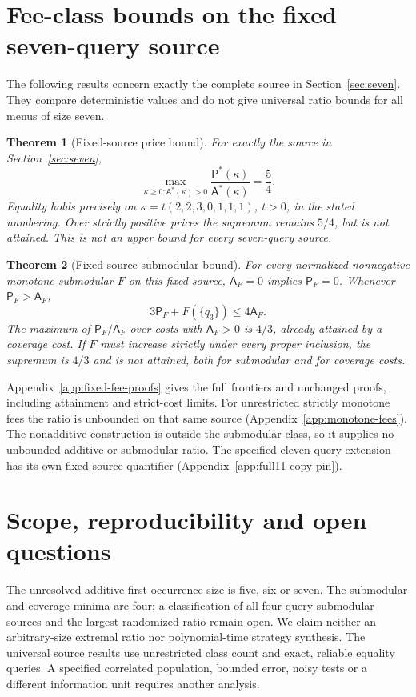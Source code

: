 \documentclass[pdflatex,sn-mathphys-num]{sn-jnl}
\newcommand{\A}{\mathsf{A}}
\newcommand{\Pcost}{\mathsf{P}}
\theoremstyle{thmstyleone}
\newtheorem{theorem}{Theorem}
\theoremstyle{thmstylethree}
\theoremstyle{thmstyletwo}
\begin{document}
\section{Fee-class bounds on the fixed seven-query source}
\label{sec:fixed-cost-core}
The following results concern exactly the complete source in
Section~\ref{sec:seven}. They compare deterministic values and do not
give universal ratio bounds for all menus of size seven.

\begin{theorem}[Fixed-source price bound]\label{thm:price}
For exactly the source in Section~\ref{sec:seven},
\[
 \max_{\kappa\geq0:\A^*(\kappa)>0}
 \frac{\Pcost^*(\kappa)}{\A^*(\kappa)}=\frac54.
\]
Equality holds precisely on $\kappa=t(2,2,3,0,1,1,1)$, $t>0$, in the stated numbering. Over strictly positive prices the supremum remains $5/4$, but is not attained. This is not an upper bound for every seven-query source.
\end{theorem}

\begin{theorem}[Fixed-source submodular bound]\label{thm:submodular}
For every normalized nonnegative monotone submodular $F$ on this fixed source, $\A_F=0$ implies $\Pcost_F=0$. Whenever $\Pcost_F>\A_F$,
\begin{equation}\label{eq:strengthened}
 3\Pcost_F+F(\{q_3\})\leq4\A_F.
\end{equation}
The maximum of $\Pcost_F/\A_F$ over costs with $\A_F>0$ is $4/3$, already attained by a coverage cost. If $F$ must increase strictly under every proper inclusion, the supremum is $4/3$ and is not attained, both for submodular and for coverage costs.
\end{theorem}

Appendix~\ref{app:fixed-fee-proofs} gives the full frontiers and
unchanged proofs, including attainment and strict-cost limits.
For unrestricted strictly monotone fees the ratio is unbounded on
that same source (Appendix~\ref{app:monotone-fees}). The nonadditive
construction is outside the submodular class, so it supplies no
unbounded additive or submodular ratio. The specified eleven-query
extension has its own fixed-source quantifier
(Appendix~\ref{app:full11-copy-pin}).

\section{Scope, reproducibility and open questions}
\label{sec:scope-core}
The unresolved additive first-occurrence size is five, six or seven.
The submodular and coverage minima are four; a classification of all
four-query submodular sources and the largest randomized ratio remain
open. We claim neither an
arbitrary-size extremal ratio nor polynomial-time strategy synthesis.
The universal source results use unrestricted class count and exact,
reliable equality queries. A specified correlated population, bounded
error, noisy tests or a different information unit requires another analysis.
\end{document}
